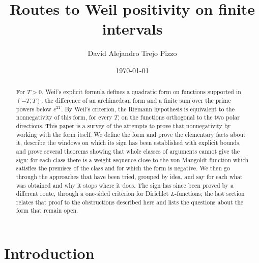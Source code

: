 \documentclass[11pt]{amsart}
\theoremstyle{definition}
\theoremstyle{remark}
\numberwithin{equation}{section}
\begin{document}
\title{Routes to Weil positivity on finite intervals}

\author{David Alejandro Trejo Pizzo}

\date{\today}

\begin{abstract}
For $T>0$, Weil's explicit formula defines a quadratic form on functions supported in $(-T,T)$, the difference of
an archimedean form and a finite sum over the prime powers below $e^{2T}$. By Weil's criterion, the Riemann
hypothesis is equivalent to the nonnegativity of this form, for every $T$, on the functions orthogonal to the two
polar directions. This paper is a survey of the attempts to prove that nonnegativity by working with the form
itself. We define the form and prove the elementary facts about it, describe the windows on which its sign has
been established with explicit bounds, and prove several theorems showing that whole classes of arguments cannot
give the sign: for each class there is a weight sequence close to the von Mangoldt function which satisfies the
premises of the class and for which the form is negative. We then go through the approaches that have been
tried, grouped by idea, and say for each what was obtained and why it stops where it does. The sign has since
been proved by a different route, through a one-sided criterion for Dirichlet $L$-functions; the last section
relates that proof to the obstructions described here and lists the questions about the form that remain open.
\end{abstract}

\maketitle
\tableofcontents

\section{Introduction}\label{w1:sec:intro}
\end{document}
